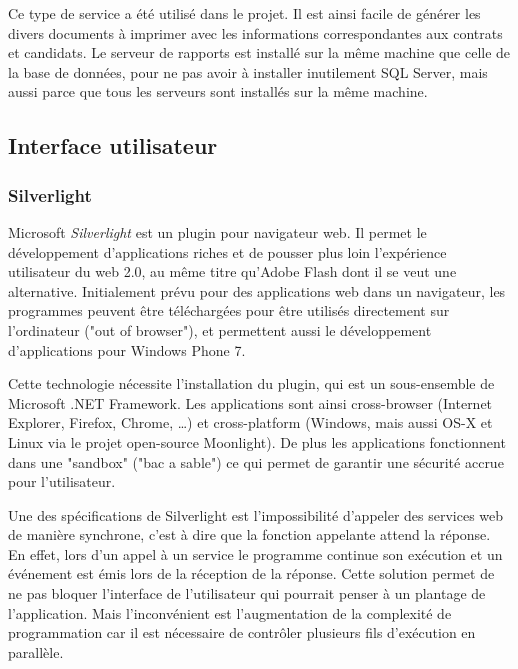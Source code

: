 Ce type de service a été utilisé dans le projet. Il est ainsi facile de générer les divers documents à imprimer avec les informations correspondantes aux contrats et candidats. Le serveur de rapports est installé sur la même machine que celle de la base de données, pour ne pas avoir à installer inutilement SQL Server, mais aussi parce que tous les serveurs sont installés sur la même machine.


\subsection{Interface utilisateur}


\subsubsection{Silverlight}
\label{Silverlight}

Microsoft \textit{Silverlight} est un plugin pour navigateur web. Il permet le développement d'applications riches et de pousser plus loin l'expérience utilisateur du web 2.0, au même titre qu'Adobe Flash dont il se veut une alternative. Initialement prévu pour des applications web dans un navigateur, les programmes peuvent être téléchargées pour être utilisés directement sur l'ordinateur ("out of browser"), et permettent aussi le développement d'applications pour Windows Phone 7.

Cette technologie nécessite l'installation du plugin, qui est un sous-ensemble de Microsoft .NET Framework. Les applications sont ainsi cross-browser (Internet Explorer, Firefox, Chrome, \ldots) et cross-platform (Windows, mais aussi OS-X et Linux via le projet open-source Moonlight). De plus les applications fonctionnent dans une "sandbox" ("bac a sable") ce qui permet de garantir une sécurité accrue pour l'utilisateur.

Une des spécifications de Silverlight est l'impossibilité d'appeler des services web de manière synchrone, c'est à dire que la fonction appelante attend la réponse. En effet, lors d'un appel à un service le programme continue son exécution et un événement est émis lors de la réception de la réponse. Cette solution permet de ne pas bloquer l'interface de l'utilisateur qui pourrait penser à un plantage de l'application. Mais l'inconvénient est l'augmentation de la complexité de programmation car il est nécessaire de contrôler plusieurs fils d'exécution en parallèle.


